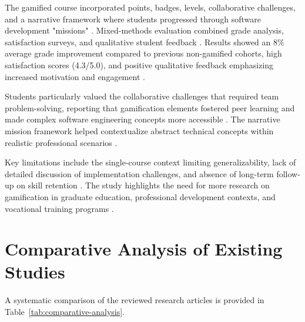 \documentclass[12pt,a4paper]{article}
\begin{document}
The gamified course incorporated points, badges, levels, collaborative challenges, and a narrative framework where students progressed through software development "missions" \parencite{sevilla2024}. Mixed-methods evaluation combined grade analysis, satisfaction surveys, and qualitative student feedback \parencite{sevilla2024}. Results showed an 8\% average grade improvement compared to previous non-gamified cohorts, high satisfaction scores (4.3/5.0), and positive qualitative feedback emphasizing increased motivation and engagement \parencite{sevilla2024}.

Students particularly valued the collaborative challenges that required team problem-solving, reporting that gamification elements fostered peer learning and made complex software engineering concepts more accessible \parencite{sevilla2024}. The narrative mission framework helped contextualize abstract technical concepts within realistic professional scenarios \parencite{sevilla2024}.

Key limitations include the single-course context limiting generalizability, lack of detailed discussion of implementation challenges, and absence of long-term follow-up on skill retention \parencite{sevilla2024}. The study highlights the need for more research on gamification in graduate education, professional development contexts, and vocational training programs \parencite{sevilla2024}.



\section{Comparative Analysis of Existing Studies}

A systematic comparison of the reviewed research articles is provided in Table~\ref{tab:comparative-analysis}.


\end{document}
